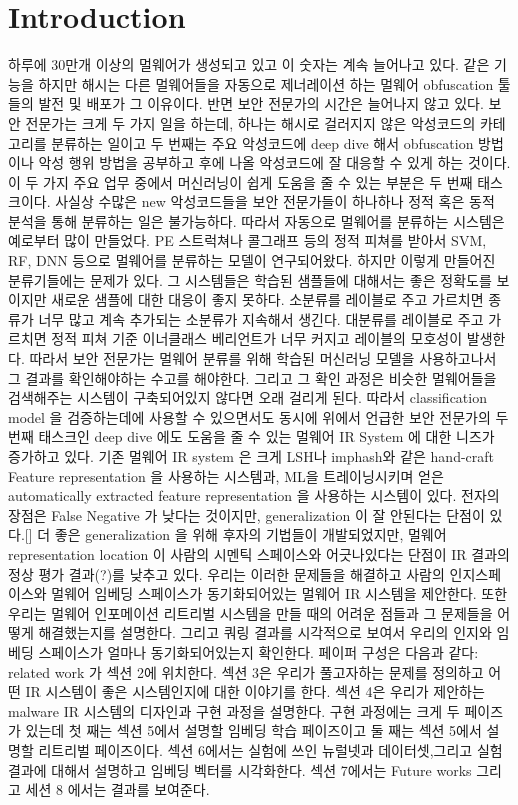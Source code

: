\section{Introduction}
하루에 30만개 이상의 멀웨어가 생성되고 있고 이 숫자는 계속 늘어나고 있다. 같은 기능을 하지만 해시는 다른 멀웨어들을 자동으로 제너레이션 하는 멀웨어 obfuscation 툴들의 발전 및 배포가 그 이유이다. 반면 보안 전문가의 시간은 늘어나지 않고 있다. 보안 전문가는 크게 두 가지 일을 하는데, 하나는 해시로 걸러지지 않은 악성코드의 카테고리를 분류하는 일이고 두 번째는  주요 악성코드에 deep dive 해서 obfuscation 방법이나 악성 행위 방법을 공부하고 후에 나올 악성코드에 잘 대응할 수 있게 하는 것이다. 
이 두 가지 주요 업무 중에서 머신러닝이 쉽게 도움을 줄 수 있는 부분은 두 번째 태스크이다. 사실상 수많은 new 악성코드들을 보안 전문가들이 하나하나 정적 혹은 동적 분석을 통해 분류하는 일은 불가능하다. 따라서 자동으로 멀웨어를 분류하는 시스템은 예로부터 많이 만들었다. PE 스트럭쳐나 콜그래프 등의 정적 피쳐를 받아서 SVM, RF, DNN 등으로 멀웨어를 분류하는 모델이 연구되어왔다. 
하지만 이렇게 만들어진 분류기들에는 문제가 있다. 그 시스템들은 학습된 샘플들에 대해서는 좋은 정확도를 보이지만 새로운 샘플에 대한 대응이 좋지 못하다. 소분류를 레이블로 주고 가르치면 종류가 너무 많고 계속 추가되는 소분류가 지속해서 생긴다. 대분류를 레이블로 주고 가르치면 정적 피쳐 기준 이너클래스 베리언트가 너무 커지고 레이블의 모호성이 발생한다. 따라서 보안 전문가는 멀웨어 분류를 위해 학습된 머신러닝 모델을 사용하고나서 그 결과를 확인해야하는 수고를 해야한다. 그리고 그 확인 과정은 비슷한 멀웨어들을 검색해주는 시스템이 구축되어있지 않다면 오래 걸리게 된다.
따라서 classification model 을 검증하는데에 사용할 수 있으면서도 동시에 위에서 언급한 보안 전문가의 두번째 태스크인 deep dive 에도 도움을 줄 수 있는 멀웨어 IR System 에 대한 니즈가 증가하고 있다. 
기존 멀웨어 IR system 은 크게 LSH나 imphash와 같은 hand-craft Feature representation 을 사용하는 시스템과, ML을 트레이닝시키며 얻은 automatically extracted feature representation 을 사용하는 시스템이 있다. 전자의 장점은 False Negative 가 낮다는 것이지만, generalization 이 잘 안된다는 단점이 있다.[] 더 좋은 generalization 을 위해 후자의 기법들이 개발되었지만, 멀웨어 representation location 이 사람의 시멘틱 스페이스와 어긋나있다는 단점이 IR 결과의 정상 평가 결과(?)를 낮추고 있다. 
우리는 이러한 문제들을 해결하고 사람의 인지스페이스와 멀웨어 임베딩 스페이스가 동기화되어있는 멀웨어 IR 시스템을 제안한다. 또한 우리는 멀웨어 인포메이션 리트리벌 시스템을 만들 때의 어려운 점들과 그 문제들을 어떻게 해결했는지를 설명한다. 그리고 쿼링 결과를 시각적으로 보여서 우리의 인지와 임베딩 스페이스가 얼마나 동기화되어있는지 확인한다.
페이퍼 구성은 다음과 같다: related work 가 섹션 2에 위치한다. 섹션 3은 우리가 풀고자하는 문제를 정의하고 어떤 IR 시스템이 좋은 시스템인지에 대한 이야기를 한다. 섹션 4은 우리가 제안하는 malware IR 시스템의 디자인과 구현 과정을 설명한다. 구현 과정에는 크게 두 페이즈가 있는데 첫 째는 섹션 5에서 설명할 임베딩 학습 페이즈이고 둘 째는 섹션 5에서 설명할 리트리벌 페이즈이다. 섹션 6에서는 실험에 쓰인 뉴럴넷과 데이터셋,그리고 실험 결과에 대해서 설명하고 임베딩 벡터를 시각화한다. 섹션 7에서는 Future works 그리고 세션 8 에서는 결과를 보여준다. 


